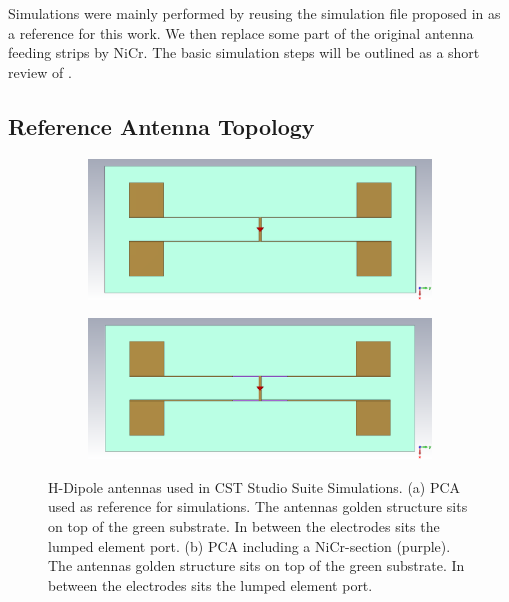 Simulations were mainly performed by reusing the simulation file proposed in \cite{nandiErAsInAlGaAsPhotoconductors2021} as a reference for this work. We then replace some part of the original antenna feeding strips by NiCr. The basic simulation steps will be outlined as a short review of \cite{nandiErAsInAlGaAsPhotoconductors2021}.   

\subsection{Reference Antenna Topology}

\begin{figure}[ht]
    \centering
    \begin{subfigure}[b]{0.75\textwidth}
        \centering
        \includegraphics[width=\textwidth]{figures/H_Dipole_ref.png}
        \caption{}
        \label{fig:ref_sim}
    \end{subfigure}
    \hfill
    \begin{subfigure}[b]{0.75\textwidth}
        \centering
        \includegraphics[width=\textwidth]{figures/H_Dipole_NiCr copy.png}
        \caption{}
        \label{fig:nicr_sim}
    \end{subfigure}
    \caption{H-Dipole antennas used in CST Studio Suite Simulations. (a) PCA used as reference for simulations. The antennas golden structure sits on top of the green substrate. In between the electrodes sits the lumped element port. (b) PCA including a NiCr-section (purple). The antennas golden structure sits on top of the green substrate. In between the electrodes sits the lumped element port.}
    \label{sim_tops}
\end{figure}

